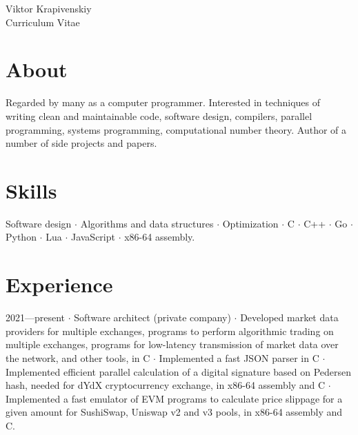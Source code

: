 \documentclass[10pt]{article}
\begin{document}
\parbox[top][0.12\textheight][c]{\linewidth}{
    \vspace{-0.04\textheight}
    \centering
    {\sffamily\Huge Viktor Krapivenskiy}\\\medskip
    {\Huge Curriculum Vitae}
}

\medskip

\section{About}

Regarded by many as a computer programmer.
Interested in
  techniques of writing clean and maintainable code,
  software design,
  compilers,
  parallel programming,
  systems programming,
  computational number theory.
Author of a number of side projects and papers.

\medskip

\section{Skills}

Software design $\cdot$
Algorithms and data structures $\cdot$
Optimization $\cdot$
C $\cdot$
C++ $\cdot$
Go $\cdot$
Python $\cdot$
Lua $\cdot$
JavaScript $\cdot$
x86-64 assembly.

\medskip

%
%

\section{Experience}

2021---present $\cdot$ Software architect (private company) $\cdot$ Developed market data providers for multiple exchanges, programs to perform algorithmic trading on multiple exchanges, programs for low-latency transmission of market data over the network, and other tools, in C $\cdot$ Implemented a fast JSON parser in C $\cdot$ Implemented efficient parallel calculation of a digital signature based on Pedersen hash, needed for dYdX cryptocurrency exchange, in x86-64 assembly and C $\cdot$ Implemented a fast emulator of EVM programs to calculate price slippage for a given amount for SushiSwap, Uniswap v2 and v3 pools, in x86-64 assembly and C.
\end{document}

